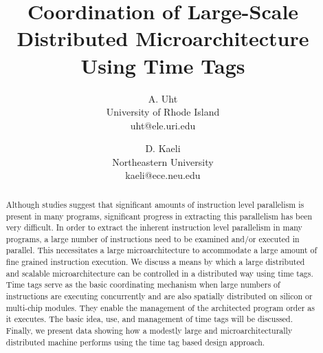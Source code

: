 \documentclass[10pt,dvips]{article}
\begin{document}
\parskip 3mm
%
%
\title{Coordination of Large-Scale Distributed 
Microarchitecture Using Time Tags}
%
\author{A. Uht\\
University of Rhode Island\\ uht@ele.uri.edu\\
\and
D. Kaeli\\
Northeastern University\\
kaeli@ece.neu.edu\\
}
%
\maketitle
\thispagestyle{empty}
%
\begin{abstract}
Although studies suggest that significant amounts of instruction
level parallelism is present in many programs, significant progress
in extracting this parallelism has been very difficult.
In order to extract the inherent instruction level parallelism in
many programs, a large number of instructions need to be examined
and/or executed in parallel.  This necessitates a large microarchitecture
to accommodate a large amount of fine grained instruction execution.
We discuss a means by which a large distributed and scalable
microarchitecture can be controlled in a distributed way using
time tags.  Time tags serve as the basic coordinating mechanism
when large numbers of instructions are executing concurrently and
are also spatially distributed on silicon or multi-chip modules.
They enable the management of the architected program order as
it executes.  The basic idea, use, and management of time tags will
be discussed.  Finally, we present data showing how a modestly large
and microarchitecturally distributed machine performs using
the time tag based design approach.
\end{abstract}
%
\end{document}
